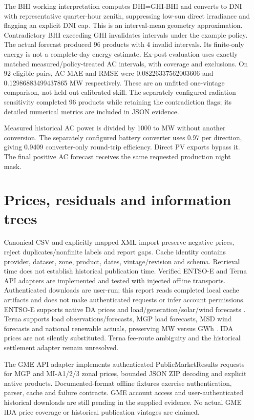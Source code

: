 \documentclass[11pt,a4paper]{article}
\begin{document}
The BHI working interpretation computes DHI=GHI-BHI and converts to DNI with
representative quarter-hour zenith, suppressing low-sun direct irradiance and
flagging an explicit DNI cap. This is an interval-mean geometry approximation.
Contradictory BHI exceeding GHI invalidates intervals under the example policy.
The actual forecast produced 96 products with
4 invalid intervals. Its finite-only
energy is not a complete-day energy estimate. Ex-post evaluation uses exactly
matched measured/policy-treated AC intervals, with coverage and exclusions.
On 92 eligible pairs, AC MAE and RMSE were
0.08226337562003606 and
0.12986883499437865 MW respectively. These are an unfitted
one-vintage comparison, not held-out calibrated skill. The separately configured
radiation sensitivity completed 96 products while retaining the contradiction flags;
its detailed numerical metrics are included in JSON evidence.

Measured historical AC power is divided by 1000 to MW without another conversion.
The separately configured battery converter uses 0.97 per direction, giving
0.9409 converter-only round-trip efficiency. Direct PV exports bypass it.
The final positive AC forecast receives the same requested production night mask.

\section{Prices, residuals and information trees}
Canonical CSV and explicitly mapped XML import preserve negative prices, reject
duplicates/nonfinite labels and report gaps. Cache identity contains provider,
dataset, zone, product, dates, vintage/revision and schema. Retrieval time does
not establish historical publication time. Verified ENTSO-E and Terna API adapters
are implemented and tested with injected offline transports. Authenticated
downloads are user-run; this report reads completed local cache artifacts and
does not make authenticated requests or infer account permissions. ENTSO-E
supports native DA prices and load/generation/solar/wind
forecasts \cite{entsoe_api_reference,entsoe_extraction_guide}. Terna supports load observations/forecasts, MGP load forecasts, MSD wind
forecasts and national renewable actuals, preserving MW versus GWh
\cite{terna_access_token,terna_total_load,terna_load_forecast,terna_wind_forecast,terna_renewables}.
IDA prices are not silently substituted. Terna fee-route ambiguity and the
historical settlement adapter remain unresolved.

The GME API adapter implements authenticated PublicMarketResults requests for
MGP and MI-A1/2/3 zonal prices, bounded JSON ZIP decoding and explicit native
products. Documented-format offline fixtures exercise authentication, parser,
cache and failure contracts. GME account access and user-authenticated historical
downloads are still pending in the supplied evidence. No actual GME IDA price
coverage or historical publication vintages are claimed.
\end{document}
